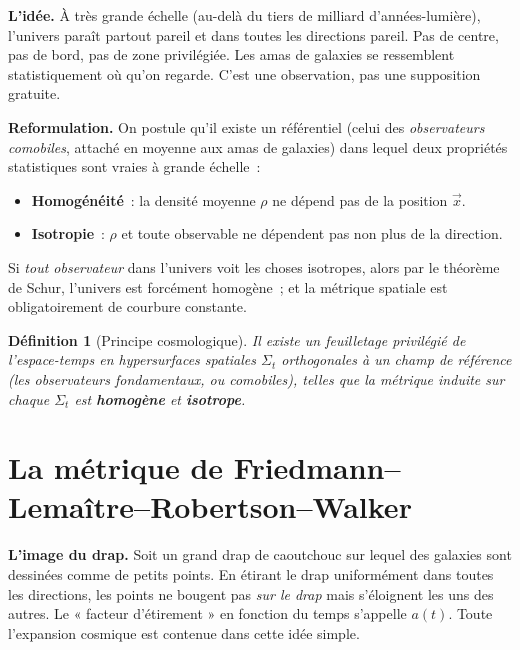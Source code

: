 \documentclass[11pt,a4paper,openany]{report}
\newtheorem{definition}[theorem]{Définition}
\begin{document}
\begin{tcolorbox}[vulgarisation]
\textbf{L'idée.} À très grande échelle (au-delà du tiers de milliard
d'années-lumière), l'univers paraît partout pareil et dans toutes les directions
pareil. Pas de centre, pas de bord, pas de zone privilégiée. Les amas de
galaxies se ressemblent statistiquement où qu'on regarde. C'est une
observation, pas une supposition gratuite.
\end{tcolorbox}

\begin{tcolorbox}[mathspe]
\textbf{Reformulation.} On postule qu'il existe un référentiel (celui des
\emph{observateurs comobiles}, attaché en moyenne aux amas de galaxies) dans
lequel deux propriétés statistiques sont vraies à grande échelle~:
\begin{itemize}[topsep=2pt]
\item \textbf{Homogénéité}~: la densité moyenne $\rho$ ne dépend pas de la
  position $\vec{x}$.
\item \textbf{Isotropie}~: $\rho$ et toute observable ne dépendent pas non plus
  de la direction.
\end{itemize}

Si \emph{tout observateur} dans l'univers voit les choses isotropes, alors par
le théorème de Schur, l'univers est forcément homogène~; et la métrique
spatiale est obligatoirement de courbure constante.
\end{tcolorbox}

\begin{definition}[Principe cosmologique]
Il existe un feuilletage privilégié de l'espace-temps en hypersurfaces
spatiales $\Sigma_t$ orthogonales à un champ de référence (les
\emph{observateurs fondamentaux}, ou \emph{comobiles}), telles que la métrique
induite sur chaque $\Sigma_t$ est \textbf{homogène} et \textbf{isotrope}.
\end{definition}

\section{La métrique de Friedmann--Lemaître--Robertson--Walker}

\begin{tcolorbox}[vulgarisation]
\textbf{L'image du drap.} Soit un grand drap de caoutchouc sur lequel des
galaxies sont dessinées comme de petits points. En étirant le drap uniformément
dans toutes les directions, les points ne bougent pas \emph{sur le drap} mais
s'éloignent les uns des autres. Le « facteur d'étirement »
en fonction du temps s'appelle $a(t)$. Toute l'expansion cosmique est
contenue dans cette idée simple.
\end{tcolorbox}
\end{document}
